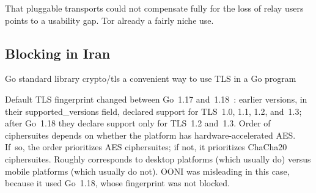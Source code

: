 \documentclass[letterpaper,twocolumn]{article}
\begin{document}
That pluggable transports could not compensate fully
for the loss of relay users points to a usability gap.
Tor already a fairly niche use.

\subsection{Blocking in Iran}
\label{sec:block-ir}


Go standard library crypto/tls a convenient way to use TLS in a Go program

Default TLS fingerprint changed between Go~1.17 and~1.18~\cite{go1.18-tls10}:
earlier versions, in their supported\_\allowbreak versions field,
declared support for TLS~1.0, 1.1, 1.2, and~1.3;
after Go~1.18 they declare support only for TLS~1.2 and~1.3.
Order of ciphersuites depends on whether the platform has hardware-accelerated AES.
If~so, the order prioritizes AES ciphersuites; if not, it prioritizes ChaCha20 ciphersuites.
Roughly corresponds to desktop platforms (which usually do) versus mobile platforms (which usually do not).
OONI was misleading in this case, because it used Go~1.18, whose fingerprint was not blocked.
\end{document}
